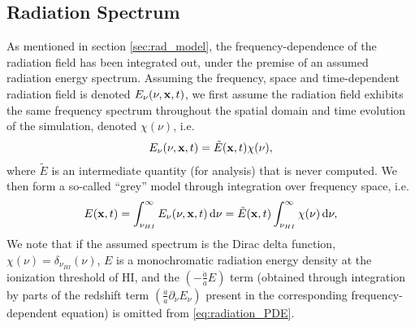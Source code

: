 \documentclass[letterpaper,10pt]{article}
\renewcommand{\(}{\left(}
\renewcommand{\)}{\right)}
\newcommand{\xvec}{{\bf x}}
\begin{document}
\subsection{Radiation Spectrum}
\label{sec:AMRFLDSplit_spectrum}

As mentioned in section \ref{sec:rad_model}, the frequency-dependence
of the radiation field has been integrated out, under the premise of
an assumed radiation energy spectrum.  Assuming the frequency, space
and time-dependent radiation field is denoted $E_{\nu}(\nu,\xvec,t)$,
we first assume the radiation field exhibits the same frequency
spectrum throughout the spatial domain and time evolution of the
simulation, denoted $\chi(\nu)$, i.e.
\begin{align}
  \label{eq:spectrum}
  E_{\nu}(\nu,\xvec,t) = \tilde{E}(\xvec,t) \chi(\nu),
\end{align}
where $\tilde{E}$ is an intermediate quantity (for analysis) that is
never computed.  We then form a so-called ``grey'' model through
integration over frequency space, i.e.
\begin{align}
  \label{eq:greyFLD}
  E(\xvec,t) = \int_{\nu_{HI}}^{\infty} E_{\nu}(\nu,\xvec,t)\,\mathrm{d}\nu 
    = \tilde{E}(\xvec,t) \int_{\nu_{HI}}^{\infty} \chi(\nu)\,\mathrm{d}\nu,
\end{align}
We note that if the assumed spectrum is the Dirac delta function,
$\chi(\nu) = \delta_{\nu_{HI}}(\nu)$, $E$ is a monochromatic radiation
energy density at the ionization threshold of HI, and the
$\left(-\frac{\dot{a}}{a}E\right)$ term (obtained through integration
by parts of the redshift term
$\left(\frac{\dot{a}}{a}\partial_{\nu}E_{\nu}\right)$ present in the
corresponding frequency-dependent equation) is omitted from
\eqref{eq:radiation_PDE}.
\end{document}
